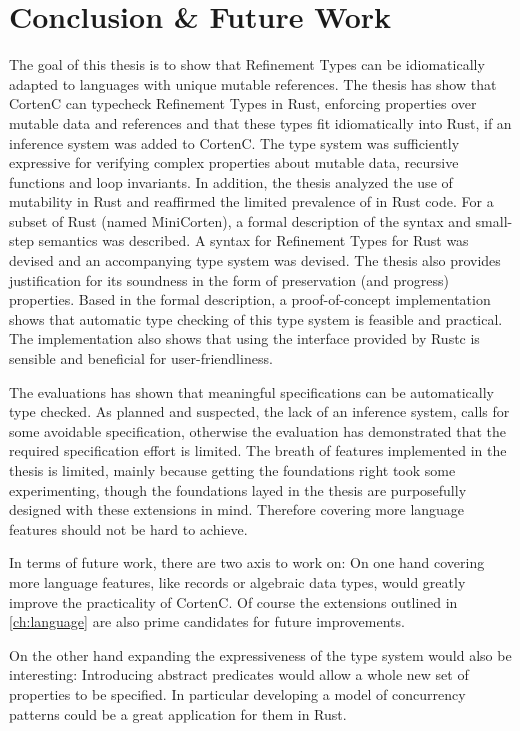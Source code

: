 \documentclass[twoside, english, final]{sdqthesis}
\theoremstyle{definition}
\begin{document}


\chapter{Conclusion \& Future Work} \label{ch:conclusion}

The goal of this thesis is to show that Refinement Types can be idiomatically adapted to languages with unique mutable references. 
The thesis has show that CortenC can typecheck Refinement Types in Rust, enforcing properties over mutable data and references and that these types fit idiomatically into Rust, if an inference system was added to CortenC.
The type system was sufficiently expressive for verifying complex properties about mutable data, recursive functions and loop invariants. 
In addition, the thesis analyzed the use of mutability in Rust and reaffirmed the limited prevalence of  in Rust code.
For a subset of Rust (named MiniCorten), a formal description of the syntax and small-step semantics was described.
A syntax for Refinement Types for Rust was devised and an accompanying type system was devised. The thesis also provides justification for its soundness in the form of preservation (and progress) properties.
Based in the formal description, a proof-of-concept implementation shows that automatic type checking of this type system is feasible and practical. The implementation also shows that using the interface provided by Rustc is sensible and beneficial for user-friendliness.

The evaluations has shown that meaningful specifications can be automatically type checked. 
As planned and suspected, the lack of an inference system, calls for some avoidable specification, otherwise the evaluation has demonstrated that the required specification effort is limited.
The breath of features implemented in the thesis is limited, mainly because getting the foundations right took some experimenting, though the foundations layed in the thesis are purposefully designed with these extensions in mind. Therefore covering more language features should not be hard to achieve.


In terms of future work, there are two axis to work on: 
On one hand covering more language features, like records or algebraic data types, would greatly improve the practicality of CortenC. Of course the extensions outlined in \cref{ch:language} are also prime candidates for future improvements.

On the other hand expanding the expressiveness of the type system would also be interesting: Introducing abstract predicates would allow a whole new set of properties to be specified. In particular developing a model of concurrency patterns could be a great application for them in Rust.
\end{document}
